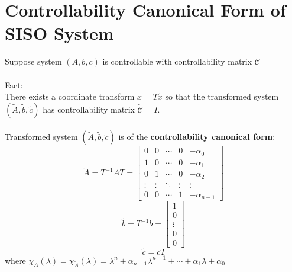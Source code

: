 \documentclass[10pt,a4paper,oneside]{article}
\begin{document}
\section{Controllability Canonical Form of SISO System}
Suppose system $(A, b, c)$ is controllable with controllability matrix $\mathcal{C}$\\
\\Fact:\\
There exists a coordinate transform $x=T\tilde{x}$ so that the transformed system $(\tilde{A}, \tilde{b}, \tilde{c})$ has controllability matrix $\tilde{\mathcal{C}}=I$.\\
\\
Transformed system $(\tilde{A},\tilde{b},\tilde{c})$ is of the {\bfseries controllability canonical form}:
\[\tilde{A}=T^{-1} A T=\left[\begin{array}{ccccc}{0} & {0} & {\cdots} & {0} & {-\alpha_{0}} \\ {1} & {0} & {\cdots} & {0} & {-\alpha_{1}} \\ {0} & {1} & {\cdots} & {0} & {-\alpha_{2}} \\ {\vdots} & {\vdots} & {\ddots} & {\vdots} & {\vdots} \\ {0} & {0} & {\cdots} & {1} & {-\alpha_{n-1}}\end{array}\right]\]
\[
\tilde{b}=T^{-1} b=\left[\begin{array}{c}{1}\\{0} \\ {\vdots} \\ {0} \\ {0}\end{array}\right]
\]
\[
\tilde{c}=cT
\]
where $\chi_{A}(\lambda)=\chi_{\tilde{A}}(\lambda)=\lambda^{n}+\alpha_{n-1} \lambda^{n-1}+\cdots+\alpha_{1} \lambda+\alpha_{0}$
\end{document}

